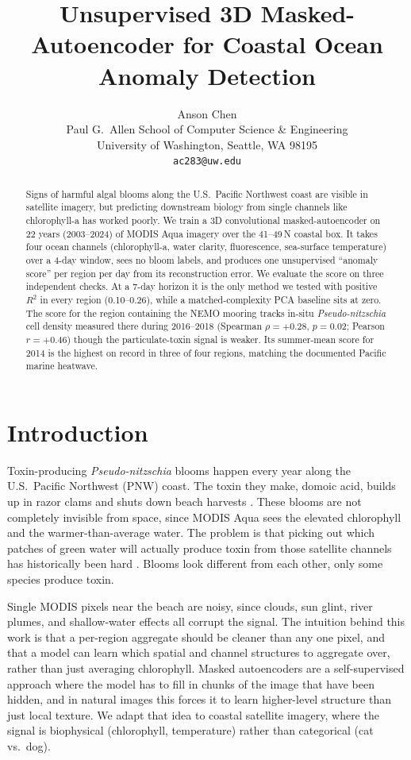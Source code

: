 \documentclass[10pt,twocolumn,letterpaper]{article}
\title{Unsupervised 3D Masked-Autoencoder for Coastal Ocean Anomaly Detection}
\author{Anson Chen\\
Paul G.\ Allen School of Computer Science \& Engineering\\
University of Washington, Seattle, WA 98195\\
{\tt\small ac283@uw.edu}}
\begin{document}
\maketitle

\begin{abstract}
Signs of harmful algal blooms along the U.S.\ Pacific Northwest coast are visible in satellite imagery, but predicting downstream biology from single channels like chlorophyll-a has worked poorly. We train a 3D convolutional masked-autoencoder on 22 years (2003--2024) of MODIS Aqua imagery over the 41--49\textdegree\,N coastal box. It takes four ocean channels (chlorophyll-a, water clarity, fluorescence, sea-surface temperature) over a 4-day window, sees no bloom labels, and produces one unsupervised ``anomaly score'' per region per day from its reconstruction error. We evaluate the score on three independent checks. At a 7-day horizon it is the only method we tested with positive $R^2$ in every region (0.10--0.26), while a matched-complexity PCA baseline sits at zero. The score for the region containing the NEMO mooring tracks in-situ \textit{Pseudo-nitzschia} cell density measured there during 2016--2018 (Spearman $\rho{=}{+}0.28$, $p{=}0.02$; Pearson $r{=}{+}0.46$) though the particulate-toxin signal is weaker. Its summer-mean score for 2014 is the highest on record in three of four regions, matching the documented Pacific marine heatwave.
\end{abstract}

\section{Introduction}
\label{sec:intro}

Toxin-producing \textit{Pseudo-nitzschia} blooms happen every year along the U.S.\ Pacific Northwest (PNW) coast. The toxin they make, domoic acid, builds up in razor clams and shuts down beach harvests \cite{Trainer2009,McCabe2023}. These blooms are not completely invisible from space, since MODIS Aqua sees the elevated chlorophyll and the warmer-than-average water. The problem is that picking out which patches of green water will actually produce toxin from those satellite channels has historically been hard \cite{Anderson2016,Hill2020}. Blooms look different from each other, only some species produce toxin.

Single MODIS pixels near the beach are noisy, since clouds, sun glint, river plumes, and shallow-water effects all corrupt the signal. The intuition behind this work is that a per-region aggregate should be cleaner than any one pixel, and that a model can learn which spatial and channel structures to aggregate over, rather than just averaging chlorophyll. Masked autoencoders \cite{He2022MAE} are a self-supervised approach where the model has to fill in chunks of the image that have been hidden, and in natural images this forces it to learn higher-level structure than just local texture. We adapt that idea to coastal satellite imagery, where the signal is biophysical (chlorophyll, temperature) rather than categorical (cat vs.\ dog).
\end{document}
